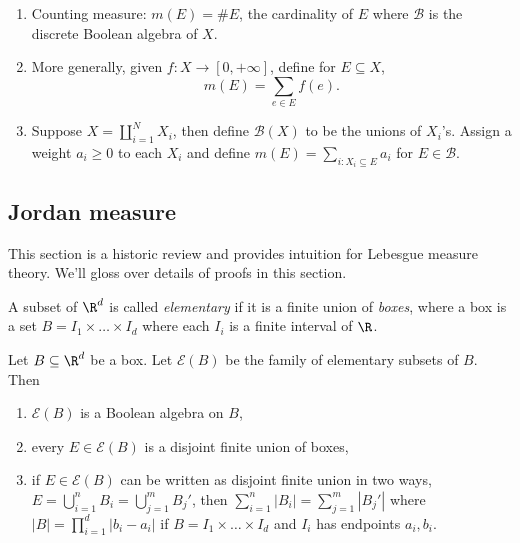 \documentclass[a4paper]{article}
\begin{document}
\begin{eg}\leavevmode
  \begin{enumerate}
  \item Counting measure: \(m(E) = \#E\), the cardinality of \(E\) where \(\mathcal B\) is the discrete Boolean algebra of \(X\).
  \item More generally, given \(f: X \to [0, +\infty]\), define for \(E \subseteq X\),
    \[
      m(E) = \sum_{e \in E} f(e).
    \]
  \item Suppose \(X = \coprod_{i = 1}^N X_i\), then define \(\mathcal B(X)\) to be the unions of \(X_i\)'s. Assign a weight \(a_i \geq 0\) to each \(X_i\) and define \(m(E) = \sum_{i: X_i \subseteq E} a_i\) for \(E \in \mathcal B\).
  \end{enumerate}
\end{eg}

\subsection{Jordan measure}

This section is a historic review and provides intuition for Lebesgue measure theory. We'll gloss over details of proofs in this section.

\begin{definition}
  A subset of \(\R^d\) is called \emph{elementary} if it is a finite union of \emph{boxes}, where a box is a set \(B = I_1 \times \dots \times I_d\) where each \(I_i\) is a finite interval of \(\R\).
\end{definition}

\begin{proposition}
  Let \(B \subseteq \R^d\) be a box. Let \(\mathcal E(B)\) be the family of elementary subsets of \(B\). Then
  \begin{enumerate}
  \item \(\mathcal E(B)\) is a Boolean algebra on \(B\),
  \item every \(E \in \mathcal E(B)\) is a disjoint finite union of boxes,
  \item if \(E \in \mathcal E(B)\) can be written as disjoint finite union in two ways, \(E = \bigcup_{i = 1}^n B_i = \bigcup_{j = 1}^m B_j'\), then \(\sum_{i = 1}^n |B_i| = \sum_{j = 1}^m |B_j'|\) where \(|B| = \prod_{i = 1}^d |b_i - a_i|\) if \(B = I_1 \times \dots \times I_d\) and \(I_i\) has endpoints \(a_i, b_i\).
  \end{enumerate}
\end{proposition}
\end{document}
